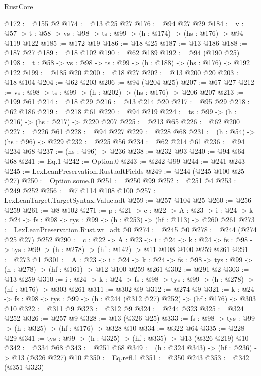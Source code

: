\begin{lexlean}{RustCore}
\begin{coremodule}
@172 := @155 @2
@174 := @13 @25 @27
@176 := @94 @27 @29
@184 := {v : @57} ->
  {t : @58} -> {vs : @98} -> {ts : @99} -> (h : @174) -> (hs : @176) -> @94 @119 @122
@185 := @172 @19
@186 := @18 @25
@187 := @13 @186
@188 := @187 @27
@189 := @18 @102
@190 := @62 @189
@192 := @94 (@190 @25)
@198 := {t : @58} -> {vs : @98} -> {ts : @99} -> (h : @188) -> (hs : @176) -> @192 @122
@199 := @185 @20
@200 := @18 @27
@202 := @13 @200 @20
@203 := @18 @104
@204 := @62 @203
@206 := @94 (@204 @25)
@207 := @67 @27
@212 := {vs : @98} -> {ts : @99} -> (h : @202) -> (hs : @176) -> @206 @207
@213 := @199 @61
@214 := @18 @29
@216 := @13 @214 @20
@217 := @95 @29
@218 := @62 @186
@219 := @218 @61
@220 := @94 @219
@224 := {ts : @99} -> (h : @216) -> (hs : @217) -> @220 @207
@225 := @213 @65
@226 := @62 @200
@227 := @226 @61
@228 := @94 @227
@229 := @228 @68
@231 := (h : @54) -> (hs : @96) -> @229
@232 := @225 @56
@234 := @62 @214 @61
@236 := @94 @234 @68
@237 := (hs : @96) -> @236
@238 := @232 @93
@240 := @94 @64 @68
@241 := Eq.{1}
@242 := Option.{0}
@243 := @242 @99
@244 := @241 @243
@245 := LexLeanPreservation.Rust.adtFields
@249 := @244 (@245 @100 @25 @27)
@250 := Option.some.{0}
@251 := @250 @99
@252 := @251 @4
@253 := @249 @252
@256 := @7 @114 @108 @100
@257 := LexLeanTarget.TargetSyntax.Value.adt
@259 := @257 @104 @25
@260 := @256 @259
@261 := @8 @102
@271 := {p : @21} ->
  {c : @22} ->
  {A : @23} ->
  {i : @24} -> {k : @24} -> {fs : @98} -> {tys : @99} -> (h : @253) -> (hf : @113) -> @260 @261
@273 := LexLeanPreservation.Rust.wt_adt @0
@274 := @245 @0
@278 := @244 (@274 @25 @27) @252
@290 := {c : @22} ->
  {A : @23} ->
  {i : @24} ->
  {k : @24} -> {fs : @98} -> {tys : @99} -> (h : @278) -> (hf : @142) -> @11 @108 @100 @259 @261
@291 := @273 @1
@301 := {A : @23} ->
  {i : @24} ->
  {k : @24} -> {fs : @98} -> {tys : @99} -> (h : @278) -> (hf : @161) -> @12 @100 @259 @261
@302 := @291 @2
@303 := @13 @259
@310 := {i : @24} ->
  {k : @24} -> {fs : @98} -> {tys : @99} -> (h : @278) -> (hf : @176) -> @303 @261
@311 := @302 @9
@312 := @274 @9
@321 := {k : @24} ->
  {fs : @98} -> {tys : @99} -> (h : @244 (@312 @27) @252) -> (hf : @176) -> @303 @10
@322 := @311 @9
@323 := @312 @9
@324 := @244 @323
@325 := @324 @252
@326 := @257 @9
@328 := @13 (@326 @25)
@333 := {fs : @98} -> {tys : @99} -> (h : @325) -> (hf : @176) -> @328 @10
@334 := @322 @64
@335 := @228 @29
@341 := {tys : @99} -> (h : @325) -> (hf : @335) -> @13 (@326 @219) @10
@342 := @334 @68
@343 := @251 @68
@349 := (h : @324 @343) -> (hf : @236) -> @13 (@326 @227) @10
@350 := Eq.refl.{1}
@351 := @350 @243
@353 := @342 (@351 @323)

\end{coremodule}
\end{lexlean}

